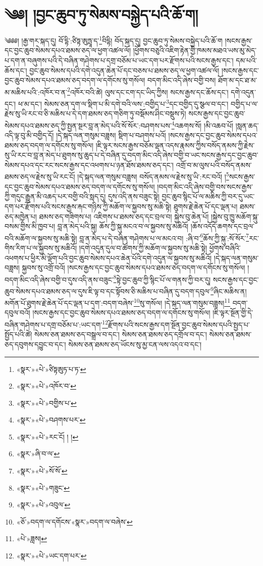 \chapter{༄༅། །བྱང་ཆུབ་ཏུ་སེམས་བསྐྱེད་པའི་ཆོ་ག།}༄༅༅། །རྒྱ་གར་སྐད་དུ། བོ་དྷི་:ཙིཏྟ་ཨུཏྤཱ་ད་\footnote{«སྣར་»«པེ་»ཙིཏྟཨུཏ་པ་ཏ་}བིདྷི། བོད་སྐད་དུ། བྱང་ཆུབ་ཏུ་སེམས་བསྐྱེད་པའི་ཆོ་ག །སངས་རྒྱས་དང་བྱང་ཆུབ་སེམས་དཔའ་ཐམས་ཅད་ལ་ཕྱག་འཚལ་ལོ། །ཕྱོགས་བཅུའི་འཇིག་རྟེན་གྱི་ཁམས་མཐའ་ཡས་མུ་མེད་པ་དག་ན་བཞུགས་པའི་དེ་བཞིན་གཤེགས་པ་དགྲ་བཅོམ་པ་ཡང་དག་པར་རྫོགས་པའི་སངས་རྒྱས་དང་། དམ་པའི་ཆོས་དང་། བྱང་ཆུབ་སེམས་དཔའི་དགེ་འདུན་ཆེན་པོ་དང་བཅས་པ་ཐམས་ཅད་ལ་ཕྱག་འཚལ་ལོ། །སངས་རྒྱས་དང་བྱང་ཆུབ་སེམས་དཔའ་ཐམས་ཅད་བདག་ལ་དགོངས་སུ་གསོལ། བདག་མིང་འདི་ཞེས་བགྱི་བས། ཐོག་མ་དང་ཐ་མ་མ་མཆིས་པའི་:འཁོར་བ་ན་\footnote{«སྣར་»«པེ་»འཁོར་བ་}འཁོར་བའི་ཚེ། ལུས་དང་ངག་དང་ཡིད་ཀྱིས། སངས་རྒྱས་དང་ཆོས་དང་། དགེ་འདུན་དང་། ཕ་མ་དང་། སེམས་ཅན་དག་ལ་སྡིག་པ་མི་དགེ་བའི་ལས་:བགྱིད་པ་\footnote{«སྣར་»«པེ་»བགྱིས་པ་}དང་བགྱིད་དུ་སྩལ་བ་དང་། བགྱིད་པ་ལ་རྗེས་སུ་ཡི་རང་བ་ཅི་མཆིས་པ་དེ་དག་ཐམས་ཅད་གཅིག་ཏུ་བསྡོམས་ཤིང་བསྡུས་ཏེ། སངས་རྒྱས་དང་བྱང་ཆུབ་སེམས་དཔའ་ཐམས་ཅད་ཀྱི་སྤྱན་སྔར་བླ་ན་མེད་པའི་སོ་སོར་:བཤགས་པས་\footnote{«སྣར་»«པེ་»བཤགས་པར་}འཆགས་སོ། །མི་འཆབ་པོ། །སླན་ཆད་འདི་ལྟ་བུ་མི་བགྱིད་དོ། །དེ་སྐད་ལན་གསུམ་བཟླས། སྡིག་པ་བཤགས་པའོ། །སངས་རྒྱས་དང་བྱང་ཆུབ་སེམས་དཔའ་ཐམས་ཅད་བདག་ལ་དགོངས་སུ་གསོལ། །ཇི་ལྟར་སངས་རྒྱས་བཅོམ་ལྡན་འདས་རྣམས་ཀྱིས་བསོད་ནམས་ཀྱི་རྗེས་སུ་ཡི་རང་བ་བླ་ན་མེད་པ་ཐུགས་སུ་ཆུད་པ་དེ་བཞིན་དུ་བདག་མིང་འདི་ཞེས་བགྱི་བ་ཡང་སངས་རྒྱས་དང་བྱང་ཆུབ་སེམས་དཔའ་དང་རང་སངས་རྒྱས་དང་འཕགས་པ་ཉན་ཐོས་ཐམས་ཅད་དང་། འགྲོ་བ་མ་ལུས་པའི་བསོད་ནམས་ཐམས་ཅད་ལ་རྗེས་སུ་ཡི་རང་ངོ། །དེ་སྐད་ལན་གསུམ་བཟླས། བསོད་ནམས་ལ་རྗེས་སུ་ཡི་:རང་བའོ། །\footnote{«སྣར་»«པེ་»རང་ངོ། ། །}སངས་རྒྱས་དང་བྱང་ཆུབ་སེམས་དཔའ་ཐམས་ཅད་བདག་ལ་དགོངས་སུ་གསོལ། །བདག་མིང་འདི་ཞེས་བགྱི་བས་སངས་རྒྱས་ཀྱི་གདུང་རྒྱུན་མི་འཆད་པར་བགྱི་བའི་སླད་དུ། དུས་འདི་ནས་བཟུང་སྟེ། བྱང་ཆུབ་སྙིང་པོ་ལ་མཆིས་ཀྱི་བར་དུ་ཡང་དག་པར་རྫོགས་པའི་སངས་རྒྱས་རྐང་གཉིས་ཀྱི་མཆོག་ལ་སྐྱབས་སུ་མཆི་སྟེ། ཐུགས་རྗེ་ཆེན་པོ་དང་ལྡན་པ། ཐམས་ཅད་མཁྱེན་པ། ཐམས་ཅད་གཟིགས་པ། འཇིགས་པ་ཐམས་ཅད་དང་བྲལ་བ། སྐྱེས་བུ་ཆེན་པོ། །སྐྱེས་བུ་ཁྱུ་མཆོག་སྐུ་བསམ་གྱིས་མི་ཁྱབ་པ། བླ་ན་མེད་པའི་སྐུ། ཆོས་ཀྱི་སྐུ་མངའ་བ་ལ་སྐྱབས་སུ་མཆིའོ། །ཆོས་འདོད་ཆགས་དང་བྲལ་བའི་མཆོག་ལ་སྐྱབས་སུ་མཆི་སྟེ། བླ་ན་མེད་པ་དེ་བཞིན་གཤེགས་པ་ལ་མངའ་བ། :ཞི་བ་\footnote{«སྣར་»ཞི་བ་ལ་}ཆོས་ཀྱི་སྐུ་:སོ་སོར་\footnote{«སྣར་»«པེ་»སོ་སོ་}རང་གིས་རིག་པ་ལ་སྐྱབས་སུ་མཆིའོ། །དགེ་འདུན་དུལ་བ་ཚོགས་ཀྱི་མཆོག་ལ་སྐྱབས་སུ་མཆི་སྟེ། ཕྱོགས་བཞིའི་འཕགས་པ་ཕྱིར་མི་ལྡོག་པའི་བྱང་ཆུབ་སེམས་དཔའ་ཆེན་པོའི་དགེ་འདུན་ལ་སྐྱབས་སུ་མཆིའོ། །དེ་སྐད་ལན་གསུམ་བཟླས། སྐྱབས་སུ་འགྲོ་བའོ། །སངས་རྒྱས་དང་བྱང་ཆུབ་སེམས་དཔའ་ཐམས་ཅད་བདག་ལ་དགོངས་སུ་གསོལ། །བདག་མིང་འདི་ཞེས་བགྱི་བ་དུས་འདི་ནས་བཟུང་\footnote{«སྣར་»«པེ་»གཟུང་}སྟེ་བྱང་ཆུབ་ཀྱི་སྙིང་པོ་ལ་གནས་ཀྱི་བར་དུ། སངས་རྒྱས་དང་བྱང་ཆུབ་སེམས་དཔའ་ཐམས་ཅད་ལ་དུས་ཇི་ལྟ་བ་དང་སྟོབས་ཅི་མཆིས་པ་བཞིན་དུ་བདག་དབུལ་\footnote{«སྣར་»«པེ་»འབུལ་}ཞིང་མཆིས་ན། མགོན་པོ་ཐུགས་རྗེ་ཆེན་པོ་དང་ལྡན་པ་དག་:བདག་བཞེས་\footnote{«ཅོ་»བདག་ལ་དགོངས་«སྣར་»བདག་ལ་བཞེས་}སུ་གསོལ། །དེ་སྐད་ལན་གསུམ་བཟླས།\footnote{«པེ་»ཟླས།} བདག་དབུལ་བའོ། །སངས་རྒྱས་དང་བྱང་ཆུབ་སེམས་དཔའ་ཐམས་ཅད་བདག་ལ་དགོངས་སུ་གསོལ། །ཇི་ལྟར་སྔོན་གྱི་དེ་བཞིན་གཤེགས་པ་དགྲ་བཅོམ་པ་:ཡང་དག་\footnote{«སྣར་»«པེ་»ཡང་དག་པར་}རྫོགས་པའི་སངས་རྒྱས་དག་སྔོན་བྱང་ཆུབ་སེམས་དཔའི་སྤྱད་པ་སྤྱོད་པའི་ཚེ། སེམས་ཅན་ཐམས་ཅད་བསྒྲལ་བ་དང་། སེམས་ཅན་ཐམས་ཅད་དགྲོལ་བ་དང་། སེམས་ཅན་ཐམས་ཅད་དབུགས་དབྱུང་བ་དང་། སེམས་ཅན་ཐམས་ཅད་ཡོངས་སུ་མྱ་ངན་ལས་འདའ་བ་དང་། 